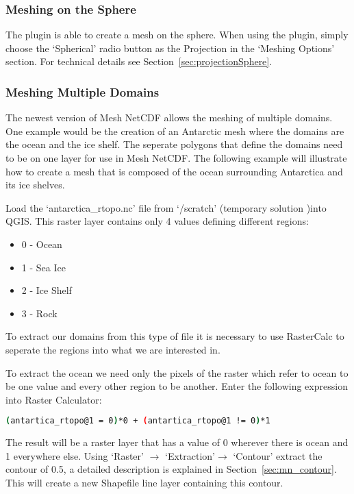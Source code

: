 \newpage
\subsubsection{Meshing on the Sphere}
\label{sec:meshSphere}
The plugin is able to create a mesh on the sphere. When using the plugin, simply choose the `Spherical' radio button as the Projection in the `Meshing Options' section. For technical details see Section~\ref{sec:projectionSphere}.

\subsubsection{Meshing Multiple Domains} 
The newest version of Mesh NetCDF allows the meshing of multiple domains. One example would be the creation of an Antarctic mesh where the domains are the ocean and the ice shelf. The seperate polygons that define the domains need to be on one layer for use in Mesh NetCDF. The following example will illustrate how to create a mesh that is composed of the ocean surrounding Antarctica and its ice shelves.

Load the `antarctica\_rtopo.nc' file from `/scratch' (temporary solution )into QGIS. This raster layer contains only 4 values defining different regions:

\begin{itemize}
  \item 0 - Ocean
  \item 1 - Sea Ice
  \item 2 - Ice Shelf
  \item 3 - Rock
\end{itemize}

To extract our domains from this type of file it is necessary to use RasterCalc to seperate the regions into what we are interested in.

To extract the ocean we need only the pixels of the raster which refer to ocean to be one value and every other region to be another. Enter the following expression into Raster Calculator: 

\begin{example}
  \begin{lstlisting}[language=bash]
  (antartica_rtopo@1 = 0)*0 + (antartica_rtopo@1 != 0)*1
  \end{lstlisting}
\end{example}

The result will be a raster layer that has a value of 0 wherever there is ocean and 1 everywhere else. Using `Raster' $\rightarrow$ `Extraction'$\rightarrow$ `Contour' extract the contour of 0.5, a detailed description is explained in Section~\ref{sec:mn_contour}. This will create a new Shapefile line layer containing this contour.


